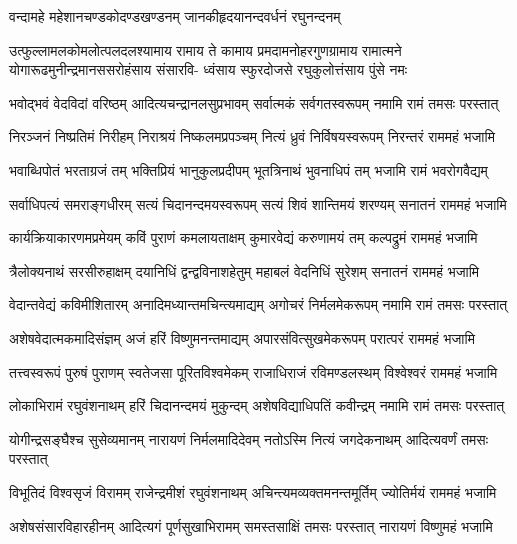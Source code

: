 \twolineshloka
{वन्दामहे महेशानचण्डकोदण्डखण्डनम्}
{जानकीहृदयानन्दवर्धनं रघुनन्दनम्}%

\fourlineindentedshloka
{उत्फुल्लामलकोमलोत्पलदलश्यामाय रामाय ते}
{कामाय प्रमदामनोहरगुणग्रामाय रामात्मने}
{योगारूढमुनीन्द्रमानससरोहंसाय संसारवि-}
{ध्वंसाय स्फुरदोजसे रघुकुलोत्तंसाय पुंसे नमः}%

\fourlineindentedshloka
{भवोद्भवं वेदविदां वरिष्ठम्}
{आदित्यचन्द्रानलसुप्रभावम्}
{सर्वात्मकं सर्वगतस्वरूपम्}
{नमामि रामं तमसः परस्तात्}%

\fourlineindentedshloka
{निरञ्जनं निष्प्रतिमं निरीहम्}
{निराश्रयं निष्कलमप्रपञ्चम्}
{नित्यं ध्रुवं निर्विषयस्वरूपम्}
{निरन्तरं राममहं भजामि}%

\fourlineindentedshloka
{भवाब्धिपोतं भरताग्रजं तम्}
{भक्तिप्रियं भानुकुलप्रदीपम्}
{भूतत्रिनाथं भुवनाधिपं तम्}
{भजामि रामं भवरोगवैद्यम्}%

\fourlineindentedshloka
{सर्वाधिपत्यं समराङ्गधीरम्}
{सत्यं चिदानन्दमयस्वरूपम्}
{सत्यं शिवं शान्तिमयं शरण्यम्}
{सनातनं राममहं भजामि}%

\fourlineindentedshloka
{कार्यक्रियाकारणमप्रमेयम्}
{कविं पुराणं कमलायताक्षम्}
{कुमारवेद्यं करुणामयं तम्}
{कल्पद्रुमं राममहं भजामि}%

\fourlineindentedshloka
{त्रैलोक्यनाथं सरसीरुहाक्षम्}
{दयानिधिं द्वन्द्वविनाशहेतुम्}
{महाबलं वेदनिधिं सुरेशम्}
{सनातनं राममहं भजामि}%

\fourlineindentedshloka
{वेदान्तवेद्यं कविमीशितारम्}
{अनादिमध्यान्तमचिन्त्यमाद्यम्}
{अगोचरं निर्मलमेकरूपम्}
{नमामि रामं तमसः परस्तात्}%

\fourlineindentedshloka
{अशेषवेदात्मकमादिसंज्ञम्}
{अजं हरिं विष्णुमनन्तमाद्यम्}
{अपारसंवित्सुखमेकरूपम्}
{परात्परं राममहं भजामि}%

\fourlineindentedshloka
{तत्त्वस्वरूपं पुरुषं पुराणम्}
{स्वतेजसा पूरितविश्वमेकम्}
{राजाधिराजं रविमण्डलस्थम्}
{विश्वेश्वरं राममहं भजामि}%

\fourlineindentedshloka
{लोकाभिरामं रघुवंशनाथम्}
{हरिं चिदानन्दमयं मुकुन्दम्}
{अशेषविद्याधिपतिं कवीन्द्रम्}
{नमामि रामं तमसः परस्तात्}%

\fourlineindentedshloka
{योगीन्द्रसङ्घैश्च सुसेव्यमानम्}
{नारायणं निर्मलमादिदेवम्}
{नतोऽस्मि नित्यं जगदेकनाथम्}
{आदित्यवर्णं तमसः परस्तात्}%

\fourlineindentedshloka
{विभूतिदं विश्वसृजं विरामम्}
{राजेन्द्रमीशं रघुवंशनाथम्}
{अचिन्त्यमव्यक्तमनन्तमूर्तिम्}
{ज्योतिर्मयं राममहं भजामि}%

\fourlineindentedshloka
{अशेषसंसारविहारहीनम्}
{आदित्यगं पूर्णसुखाभिरामम्}
{समस्तसाक्षिं तमसः परस्तात्}
{नारायणं विष्णुमहं भजामि}%

